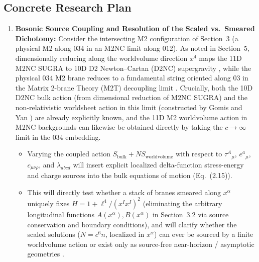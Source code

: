 \documentclass[11pt]{article}
\begin{document}
\subsection*{Concrete Research Plan}
\begin{enumerate}
    \item \textbf{Bosonic Source Coupling and Resolution of the Scaled vs.\ Smeared Dichotomy:}
    Consider the intersecting M2 configuration of Section~3 (a physical M2 along $034$ in an M2NC limit along $012$). As noted in Section~5, dimensionally reducing along the worldvolume direction $x^4$ maps the 11D M2NC SUGRA to 10D D2 Newton--Cartan (D2NC) supergravity \cite{Blair:2021waq}, while the physical $034$ M2 brane reduces to a fundamental string oriented along $03$ in the Matrix 2-brane Theory (M2T) decoupling limit \cite{Blair:2023noj,Gomis:2023eav,Blair:2024aqz}. Crucially, both the 10D D2NC bulk action (from dimensional reduction of M2NC SUGRA) and the non-relativistic worldsheet action in this limit (constructed by Gomis and Yan \cite{Gomis:2023eav}) are already explicitly known, and the 11D M2 worldvolume action in M2NC backgrounds can likewise be obtained directly by taking the $c\to\infty$ limit in the $034$ embedding.
    \begin{itemize}
        \item Varying the coupled action $S_{\text{bulk}} + N S_{\text{worldvolume}}$ with respect to $\tau^A{}_\mu$, $e^a{}_\mu$, $c_{\mu\nu\rho}$, and $\lambda_{abcd}$ will insert explicit localized delta-function stress-energy and charge sources into the bulk equations of motion (Eq.~(2.15)).
        \item This will directly test whether a stack of branes smeared along $x^\alpha$ uniquely fixes $H = 1 + \ell^4/(x^I x^I)^2$ (eliminating the arbitrary longitudinal functions $A(x^\alpha), B(x^\alpha)$ in Section~3.2 via source conservation and boundary conditions), and will clarify whether the scaled solutions ($N = c^6 n$, localized in $x^\alpha$) can ever be sourced by a finite worldvolume action or exist only as source-free near-horizon / asymptotic geometries \cite{Maskalaniec:2026}.
    \end{itemize}


\end{enumerate}
\end{document}
